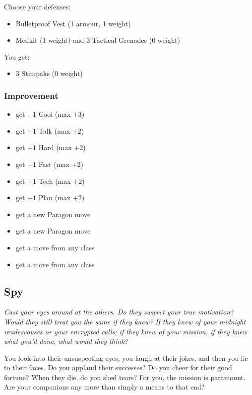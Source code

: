 Choose your defenses:
\begin{itemize}
\item Bulletproof Vest (1 armour, 1 weight)
\item Medkit (1 weight) and 3 Tactical Grenades (0 weight)
\end{itemize}

You get:
\begin{itemize}
\item 3 Stimpaks (0 weight)
\end{itemize}

\subsubsection{Improvement}
\begin{itemize}
\item get $+1$ Cool (max $+3$)
\item get $+1$ Talk (max $+2$)
\item get $+1$ Hard (max $+2$)
\item get $+1$ Fast (max $+2$)
\item get $+1$ Tech (max $+2$)
\item get $+1$ Plan (max $+2$)
\item get a new Paragon move
\item get a new Paragon move
\item get a move from any class
\item get a move from any class
\end{itemize}



\subsection{Spy}

{\itshape Cast your eyes around at the others. Do they suspect your
  true motivation? Would they still treat you the same if they knew?
  If they knew of your midnight rendezvouses or your encrypted calls;
  if they knew of your mission, if they knew what you'd done, what
  would they think?

You look into their unsuspecting eyes, you laugh at their jokes, and
then you lie to their faces. Do you applaud their successes? Do you
cheer for their good fortune? When they die, do you shed tears? For
you, the mission is paramount. Are your companions any more than
simply a means to that end?}

